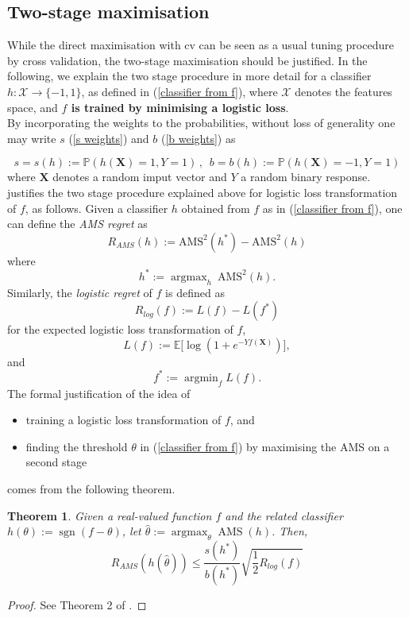 \documentclass[]{article}
\DeclareMathOperator*{\argmin}{argmin}
\DeclareMathOperator*{\argmax}{argmax}
\newtheorem{theorem}{Theorem}[section]
\begin{document}
\subsection{Two-stage maximisation}

While the direct maximisation with cv can be seen as a usual tuning procedure by cross validation, the two-stage maximisation should be justified. In the following, we explain the two stage procedure in more detail for a classifier $h:\mathcal{X}\to \{-1,1\}$, as defined in (\ref{classifier from f}), where $\mathcal{X}$ denotes the features space, and \textbf{$f$ is trained by minimising a logistic loss}.\\

By incorporating the weights to the probabilities, without loss of generality one may write  $s$ (\ref{s weights}) and $b$ (\ref{b weights}) as

$$s=s(h):=\mathbb{P}(h(\bm{X})=1,Y=1) \,\text{,} \ \ \ b=b(h):=\mathbb{P}(h(\bm{X})=-1,Y=1)$$
where $\bm{X}$ denotes a random imput vector and $Y$ a random binary response. \cite{kotlowski2014consistent} justifies the two stage procedure explained above for logistic loss transformation of $f$, as follows. Given a classifier $h$ obtained from $f$ as in (\ref{classifier from f}), one can define the \textit{AMS regret} as
\begin{equation}
\label{regret}
R_{AMS}(h):= \text{AMS}^2(h^*)-\text{AMS}^2(h)
\end{equation}
where $$h^*:=\argmax_h \ \text{AMS}^2(h).$$
Similarly, the \textit{logistic regret} of $f$ is defined as
\begin{equation}
\label{logistic regret}
R_{log}(f):= L(f)-L(f^*)
\end{equation}
for the expected logistic loss transformation of $f$,
\begin{equation}
\label{eq: logloss}
L(f):=\mathbb{E}\Big[\log(1+e^{-Yf(\bm{X})})\Big],
\end{equation}
and $$f^*:=\argmin_f L(f).$$
The formal justification of the idea of 
\begin{itemize}
\item training a logistic loss transformation of $f$, and
\item finding the threshold $\theta$ in (\ref{classifier from f}) by maximising the AMS on a second stage
\end{itemize}
comes from the following theorem.

\begin{theorem}
\label{thm: two stage maximisation}
Given a real-valued function $f$ and the related classifier $h(\theta):=\operatorname{sgn}(f-\theta)$,  let $\hat{\theta}:=\argmax_\theta\operatorname{AMS}(h)$. Then,
\begin{equation}
\label{regret inequality}
R_{AMS}(h(\hat{\theta}))\leq \frac{s(h^*)}{b(h^*)}\sqrt{\frac{1}{2}R_{log}(f)}
\end{equation}

\end{theorem}
\begin{proof}
 See Theorem 2 of \cite{kotlowski2014consistent}.
\end{proof}
\end{document}
